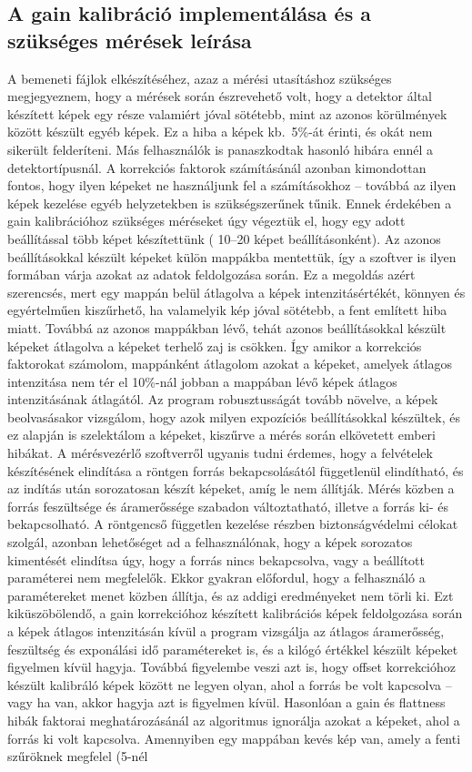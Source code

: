 \documentclass[a4paper,12pt]{article}
\begin{document}
 
\subsection{A gain kalibráció implementálása és a szükséges mérések leírása} 
\label{sec:reduce}
 
 
A bemeneti fájlok elkészítéséhez, azaz a mérési utasításhoz szükséges megjegyeznem, hogy a mérések során észrevehető volt, hogy a detektor által készített képek egy része valamiért jóval sötétebb, mint az azonos körülmények között készült egyéb képek. Ez a hiba a képek kb.\ 5\%-át érinti, és okát nem sikerült felderíteni. Más felhasználók is panaszkodtak hasonló hibára ennél a detektortípusnál. A korrekciós faktorok számításánál azonban kimondottan fontos, hogy ilyen képeket ne használjunk fel a számításokhoz -- továbbá az ilyen képek kezelése egyéb helyzetekben is szükségszerűnek tűnik. Ennek érdekében a gain kalibrációhoz szükséges méréseket úgy végeztük el, hogy egy adott beállítással több képet készítettünk ( 10--20 képet beállításonként). Az azonos beállításokkal készült képeket külön mappákba mentettük, így a szoftver is ilyen formában várja azokat az adatok feldolgozása során. Ez a megoldás azért szerencsés, mert egy mappán belül átlagolva a képek intenzitásértékét, könnyen és egyértelműen kiszűrhető, ha valamelyik kép jóval sötétebb, a fent említett hiba miatt. Továbbá az azonos mappákban lévő, tehát azonos beállításokkal készült képeket átlagolva a képeket terhelő zaj is csökken. Így amikor a korrekciós faktorokat számolom, mappánként átlagolom azokat a képeket, amelyek átlagos intenzitása nem tér el 10\%-nál jobban a mappában lévő képek átlagos intenzitásának átlagától. Az program  robusztusságát  tovább növelve, a képek beolvasásakor vizsgálom, hogy  azok milyen expozíciós beállításokkal készültek, és ez alapján is szelektálom a képeket, kiszűrve a mérés során elkövetett emberi hibákat. A mérésvezérlő szoftverről ugyanis tudni érdemes, hogy a felvételek készítésének elindítása a röntgen forrás bekapcsolásától függetlenül elindítható, és az indítás után sorozatosan készít képeket, amíg le nem állítják. Mérés közben a forrás feszültsége és áramerőssége szabadon változtatható, illetve a forrás ki- és bekapcsolható. A röntgencső független kezelése részben biztonságvédelmi célokat szolgál, azonban lehetőséget ad a felhasználónak, hogy a képek sorozatos kimentését elindítsa úgy, hogy a forrás nincs bekapcsolva, vagy a beállított paraméterei nem megfelelők. Ekkor gyakran előfordul, hogy a felhasználó a paramétereket menet közben állítja, és az addigi eredményeket nem törli ki. Ezt kiküszöbölendő, a gain korrekcióhoz készített kalibrációs képek feldolgozása során a képek átlagos intenzitásán kívül a program vizsgálja az átlagos áramerősség, feszültség és exponálási idő paramétereket is, és a kilógó értékkel készült képeket figyelmen kívül hagyja. Továbbá figyelembe veszi azt is, hogy offset korrekcióhoz készült kalibráló képek között ne legyen olyan, ahol a forrás be volt kapcsolva -- vagy ha van, akkor hagyja azt is figyelmen kívül. Hasonlóan a gain és flattness hibák faktorai meghatározásánál az algoritmus ignorálja azokat a képeket, ahol a forrás ki volt kapcsolva. Amennyiben egy mappában kevés kép van, amely a fenti szűröknek megfelel (5-nél 
\end{document}
